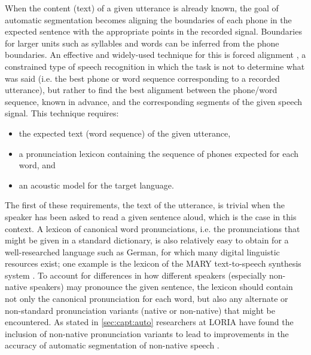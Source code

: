 	When the content (text) of a given utterance is already known, the goal of automatic segmentation becomes aligning the  boundaries of each phone in the expected sentence with the appropriate points in the recorded signal. Boundaries for larger units such as syllables and words can be inferred from the phone boundaries. 
	An effective and widely-used technique for this is 
	forced
	alignment \citep{Fohr1996,Mesbahi2011,Fohr2012,Fauth2014},
	a constrained type of speech recognition in which the task is not to determine what was said (i.e. the best phone or word sequence corresponding to a recorded utterance),  but rather to find the best alignment between the phone/word sequence, known in advance, and the corresponding segments of the given speech signal.
	This technique	requires:
	\begin{itemize}[topsep=-1em]
	\item the expected text (word sequence) of the given utterance, 
	\item a pronunciation lexicon containing the sequence of phones expected for each word, and
	\item an acoustic model for the target language.
	\end{itemize}
	
	The first of these requirements, the text of the utterance, is trivial when the speaker has been asked to read a given sentence aloud, which is the case in this context.
	A lexicon of canonical word pronunciations, i.e. the pronunciations that might be given in a standard dictionary, is also relatively easy to obtain for a well-researched language such as German, for which many digital linguistic resources exist; one example is the lexicon of the MARY text-to-speech synthesis system \citep{Schroeder2003}.
	 To account for differences in how different speakers (especially non-native speakers) may pronounce the given sentence, 
	the lexicon should contain not only the canonical pronunciation for each word, but also any alternate or non-standard pronunciation variants (native or non-native) that might be encountered. As stated in \cref{sec:capt:auto} researchers at LORIA have found the inclusion of non-native pronunciation variants to lead to improvements in the accuracy of automatic segmentation of non-native speech \citep{Jouvet2011,Mesbahi2011,Bonneau2012,Orosanu2012}.
	
